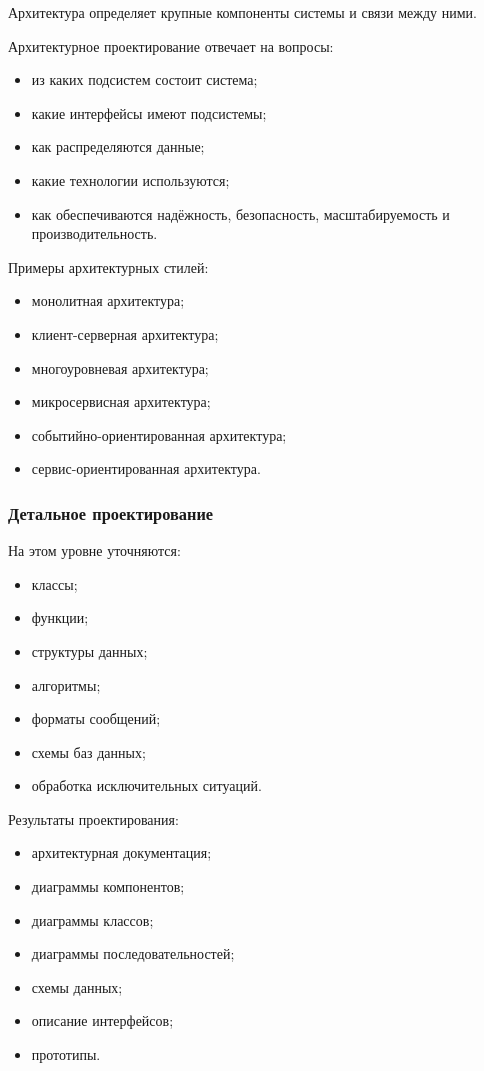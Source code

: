 \documentclass[12pt,a4paper]{article}
\begin{document}
Архитектура определяет крупные компоненты системы и связи между ними.

Архитектурное проектирование отвечает на вопросы:
\begin{itemize}
    \item из каких подсистем состоит система;
    \item какие интерфейсы имеют подсистемы;
    \item как распределяются данные;
    \item какие технологии используются;
    \item как обеспечиваются надёжность, безопасность, масштабируемость и производительность.
\end{itemize}

Примеры архитектурных стилей:
\begin{itemize}
    \item монолитная архитектура;
    \item клиент-серверная архитектура;
    \item многоуровневая архитектура;
    \item микросервисная архитектура;
    \item событийно-ориентированная архитектура;
    \item сервис-ориентированная архитектура.
\end{itemize}

\subsubsection{Детальное проектирование}

На этом уровне уточняются:
\begin{itemize}
    \item классы;
    \item функции;
    \item структуры данных;
    \item алгоритмы;
    \item форматы сообщений;
    \item схемы баз данных;
    \item обработка исключительных ситуаций.
\end{itemize}

Результаты проектирования:
\begin{itemize}
    \item архитектурная документация;
    \item диаграммы компонентов;
    \item диаграммы классов;
    \item диаграммы последовательностей;
    \item схемы данных;
    \item описание интерфейсов;
    \item прототипы.
\end{itemize}
\end{document}

